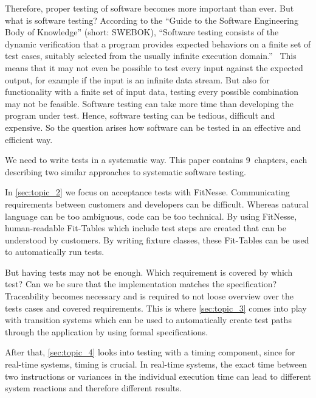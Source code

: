 Therefore, proper testing of software becomes more important than ever.
But what is software testing? According to the \enquote{Guide to the Software Engineering Body of Knowledge} (short: SWEBOK), \enquote{Software testing consists of the dynamic verification that a program provides expected behaviors on a finite set of test cases, suitably selected from the usually infinite execution domain.}~\cite{SWEBOK}
This means that it may not even be possible to test every input against the expected output, for example if the input is an infinite data stream.
But also for functionality with a finite set of input data, testing every possible combination may not be feasible.
Software testing can take more time than developing the program under test. Hence, software testing can be tedious, difficult and expensive.
So the question arises how software can be tested in an effective and efficient way.

We need to write tests in a systematic way.
This paper contains 9~chapters, %
each describing two similar approaches to systematic software testing.

In \autoref{sec:topic_2} %
we focus on acceptance tests with FitNesse.
Communicating requirements between customers and developers can be difficult.
Whereas natural language can be too ambiguous, code can be too technical.
By using FitNesse, human-readable Fit-Tables which include test steps are created that can be understood by customers. By writing fixture classes, these Fit-Tables can be used to automatically run tests.

But having tests may not be enough.
Which requirement is covered by which test?
Can we be sure that the implementation matches the specification?
Traceability becomes necessary and is required to not loose overview over the tests cases and covered requirements.
This is where
\autoref{sec:topic_3} %
comes into play with transition systems which can be used to automatically create test paths through the application by using formal specifications.


After that,
\autoref{sec:topic_4} %
looks into testing with a timing component, since for real-time systems, timing is crucial.
In real-time systems, the exact time between two instructions or variances in the individual execution time can lead to different system reactions and therefore different results.

